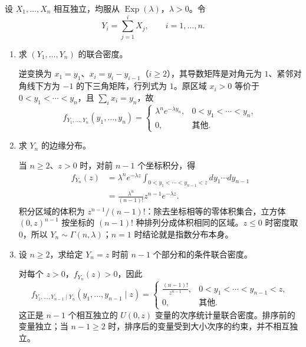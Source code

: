 \begin{example}[独立指数变量的部分和]
设 $X_1,\ldots,X_n$ 相互独立，均服从 $\operatorname{Exp}(\lambda)$，$\lambda>0$。令
\[
Y_i=\sum_{j=1}^{i}X_j,\qquad i=1,\ldots,n.
\]
\begin{enumerate}
\item 求 $(Y_1,\ldots,Y_n)$ 的联合密度。

逆变换为 $x_1=y_1$、$x_i=y_i-y_{i-1}$（$i\geq2$），其导数矩阵是对角元为 $1$、紧邻对角线下方为 $-1$ 的下三角矩阵，行列式为 $1$。原区域 $x_i>0$ 等价于 $0<y_1<\cdots<y_n$，且 $\sum_i x_i=y_n$，故
\[
f_{Y_1,\ldots,Y_n}(y_1,\ldots,y_n)=
\begin{cases}
\lambda^ne^{-\lambda y_n},&0<y_1<\cdots<y_n,\\
0,&\text{其他}.
\end{cases}
\]
\item 求 $Y_n$ 的边缘分布。

当 $n\geq2$、$z>0$ 时，对前 $n-1$ 个坐标积分，得
\begin{align*}
f_{Y_n}(z)
&=\lambda^ne^{-\lambda z}
  \int_{0<y_1<\cdots<y_{n-1}<z}dy_1\cdots dy_{n-1}\\
&=\frac{\lambda^n}{(n-1)!}z^{n-1}e^{-\lambda z}.
\end{align*}
积分区域的体积为 $z^{n-1}/(n-1)!$：除去坐标相等的零体积集合，立方体 $(0,z)^{n-1}$ 按坐标的 $(n-1)!$ 种排列分成体积相同的区域。$z\leq0$ 时密度取 $0$，所以 $Y_n\sim\Gamma(n,\lambda)$；$n=1$ 时结论就是指数分布本身。

\item 设 $n\geq2$，求给定 $Y_n=z$ 时前 $n-1$ 个部分和的条件联合密度。

对每个 $z>0$，$f_{Y_n}(z)>0$，因此
\[
f_{Y_1,\ldots,Y_{n-1}\mid Y_n}(y_1,\ldots,y_{n-1}\mid z)=
\begin{cases}
\displaystyle\frac{(n-1)!}{z^{n-1}},
&0<y_1<\cdots<y_{n-1}<z,\\
0,&\text{其他}.
\end{cases}
\]
这正是 $n-1$ 个相互独立的 $U(0,z)$ 变量的次序统计量联合密度。排序前的变量独立；当 $n-1\geq2$ 时，排序后的变量受到大小次序的约束，并不相互独立。
\end{enumerate}
\end{example}




